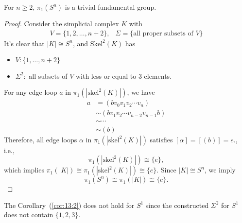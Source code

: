 \begin{corollary}\label{cor:13:2}
For $n\ge 2$, $\pi_1(S^n)$ is a trivial fundamental group.
\end{corollary}

\begin{proof}
Consider the simplicial complex $K$ with
\[
\begin{array}{ll}
V=\{1,2,\dots,n+2\},
&
\Sigma=\{\text{all proper subsets of $V$}\}
\end{array}
\]
It's clear that $|K|\cong S^n$, and $\text{Skel}^2(K)$ has
\begin{itemize}
\item
$V:\{1,\dots,n+2\}$
\item
$\Sigma^2:$ all subsets of $V$ with less or equal to $3$ elements.
\end{itemize}
For any edge loop $a$ in $\pi_1(|\text{skel}^2(K)|)$, we have
\begin{align*}
a&=(bv_0v_1v_2\cdots v_n)\\
&\sim(bv_1v_2\cdots v_{n-2}v_{n-1}b)\\
&\sim\cdots\\
&\sim(b)
\end{align*}
Therefore, all edge loops $\alpha$ in $\pi_1(|\text{skel}^2(K)|)$ satisfies $[\alpha]=[(b)]=e$., i.e.,
\[
\pi_1(|\text{skel}^2(K)|)\cong\{e\},
\]
which implies $\pi_1(|K|) \cong\pi_1(|\text{skel}^2(K)|)\cong\{e\}$.
Since $|K|\cong S^n$, we imply 
\[
\pi_1(S^n)\cong \pi_1(|K|) \cong\{e\}.
\]
\end{proof}
\begin{remark}
The Corollary~(\ref{cor:13:2}) does not hold for $S^1$ since the constructed $\Sigma^2$ for $S^1$ 
does not contain $\{1,2,3\}.$
\end{remark}

